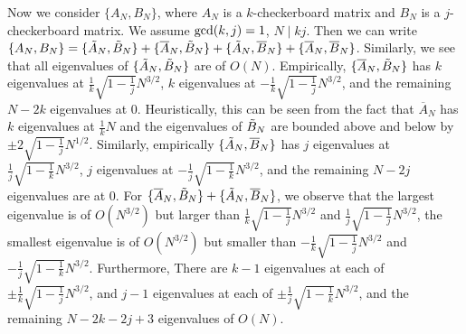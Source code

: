 \documentclass[11pt,reqno]{amsart}
\numberwithin{equation}{section}
\theoremstyle{plain}
\newtheorem{lemma}[thm]{Lemma}
\begin{document}
Now we consider $\{A_N, B_N\}$, where $A_N$ is a $k$-checkerboard matrix and $B_N$ is a $j$-checkerboard matrix. We assume $\textup{gcd}(k,j)=1$, $N\mid kj$. Then we can write $\{A_N,B_N\}=\{\Tilde{A}_N,\Tilde{B}_N\}+\{\overline{A}_N,\Tilde{B}_N\}+\{\Tilde{A}_N,\overline{B}_N\}+\{\overline{A}_N, \overline{B}_N\}$. Similarly, we see that all eigenvalues of $\{\Tilde{A}_N,\Tilde{B}_N\}$ are of $O(N)$. Empirically, $\{\overline{A}_N,\Tilde{B}_N\}$ has $k$ eigenvalues at $\frac{1}{k}\sqrt{1-\frac{1}{j}}N^{3/2}$, $k$ eigenvalues at $-\frac{1}{k}\sqrt{1-\frac{1}{j}}N^{3/2}$, and the remaining $N-2k$ eigenvalues at $0$. Heuristically, this can be seen from the fact that $\overline{A}_N$ has $k$ eigenvalues at $\frac{1}{k}N$ and the eigenvalues of $\Tilde{B}_N$ are bounded above and below by $\pm 2\sqrt{1-\frac{1}{j}}N^{1/2}$. Similarly, empirically $\{\Tilde{A}_N, \overline{B}_N\}$ has $j$ eigenvalues at $\frac{1}{j}\sqrt{1-\frac{1}{k}}N^{3/2}$, $j$ eigenvalues at $-\frac{1}{j}\sqrt{1-\frac{1}{k}}N^{3/2}$, and the remaining $N-2j$ eigenvalues are at 0. For $\{\overline{A}_N, \Tilde{B}_N\}+\{\Tilde{A}_N, \overline{B}_N\}$, we observe that the largest eigenvalue is of $O(N^{3/2})$ but larger than $\frac{1}{k}\sqrt{1-\frac{1}{j}}N^{3/2}$ and $\frac{1}{j}\sqrt{1-\frac{1}{j}}N^{3/2}$, the smallest eigenvalue is of $O(N^{3/2})$ but smaller than $-\frac{1}{k}\sqrt{1-\frac{1}{j}}N^{3/2}$ and $-\frac{1}{j}\sqrt{1-\frac{1}{k}}N^{3/2}$. Furthermore, There are $k-1$ eigenvalues at each of $\pm \frac{1}{k}\sqrt{1-\frac{1}{j}}N^{3/2}$, and $j-1$ eigenvalues at each of $\pm \frac{1}{j}\sqrt{1-\frac{1}{k}}N^{3/2}$, and the remaining $N-2k-2j+3$ eigenvalues of $O(N)$.


\end{document}
